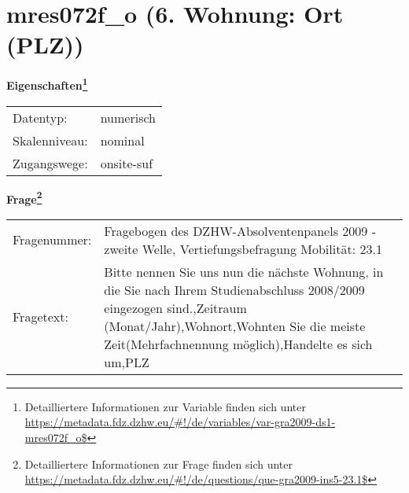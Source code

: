 
    \setcounter{footnote}{0}

    \vspace*{-1.8cm}
	\section{mres072f\_o (6. Wohnung: Ort (PLZ))}
	\label{section:mres072f_o}



    \vspace*{0.5cm}
    \noindent\textbf{Eigenschaften\footnote{Detailliertere Informationen zur Variable finden sich unter
		\url{https://metadata.fdz.dzhw.eu/\#!/de/variables/var-gra2009-ds1-mres072f_o$}}}\\
	\begin{tabularx}{\hsize}{@{}lX}
	Datentyp: & numerisch \\
	Skalenniveau: & nominal \\
	Zugangswege: &
	  onsite-suf
 \\
    \end{tabularx}



				\vspace*{0.5cm}
                \noindent\textbf{Frage\footnote{Detailliertere Informationen zur Frage finden sich unter
		              \url{https://metadata.fdz.dzhw.eu/\#!/de/questions/que-gra2009-ins5-23.1$}}}\\
				\begin{tabularx}{\hsize}{@{}lX}
					Fragenummer: &
					  Fragebogen des DZHW-Absolventenpanels 2009 - zweite Welle, Vertiefungsbefragung Mobilität:
					  23.1
 \\
					Fragetext: & Bitte nennen Sie uns nun die nächste Wohnung, in die Sie nach Ihrem Studienabschluss 2008/2009 eingezogen sind.,Zeitraum (Monat/Jahr),Wohnort,Wohnten Sie die meiste Zeit(Mehrfachnennung möglich),Handelte es sich um,PLZ \\
				\end{tabularx}





